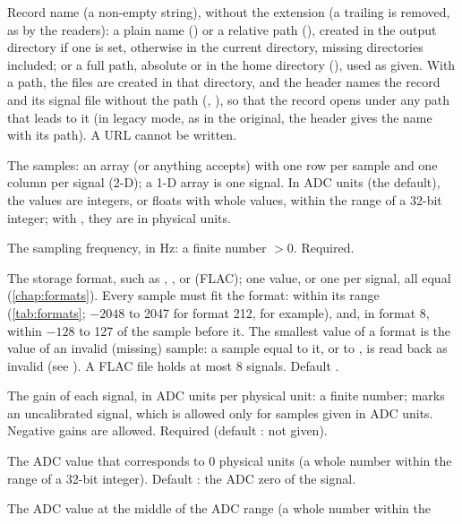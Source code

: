 \begin{params}
\item[record] Record name (a non-empty string), without the  extension (a
  trailing  is removed, as by the readers): a plain name () or a relative path (), created in the output
  directory if one is set, otherwise in the current directory, missing directories
  included; or a full path, absolute or in the home directory
  (), used as given. With a path, the files are
  created in that directory, and the header names the record and its signal file without
  the path (, ), so that the record opens under any path that
  leads to it (in legacy mode, as in the original, the header gives the name with its
  path). A URL cannot be written.
\item[signals] The samples: an array (or anything  accepts) with one
  row per sample and one column per signal (2-D); a 1-D array is one signal. In ADC units
  (the default), the values are integers, or floats with whole values, within the range of
  a 32-bit integer; with , they are in physical units.
\item[fs] The sampling frequency, in Hz: a finite number $> 0$. Required.
\item[fmt] The storage format, such as , ,  or 
  (FLAC); one value, or one per signal, all equal (\cref{chap:formats}). Every sample
  must fit the format: within its range (\cref{tab:formats}; $-2048$ to 2047 for format
  212, for example), and, in format 8, within $-128$ to 127 of the sample before it. The
  smallest value of a format is the value of an invalid (missing) sample: a sample equal
  to it, or to , is read back as invalid (see
  ). A FLAC file holds at most 8 signals. Default .
\item[gains] The gain of each signal, in ADC units per physical unit: a finite number;
   marks an uncalibrated signal, which is allowed only for samples given in ADC
  units. Negative gains are allowed. Required (default : not given).
\item[baselines] The ADC value that corresponds to 0 physical units (a whole number
  within the range of a 32-bit integer). Default : the ADC zero of the signal.
\item[adczeros] The ADC value at the middle of the ADC range (a whole number within the

\end{params}
